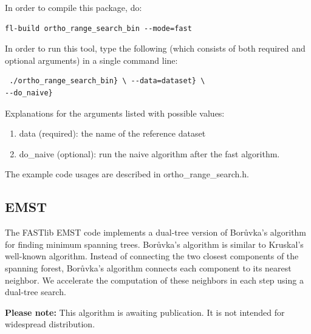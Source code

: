 \documentclass[letter]{report}
\begin{document}
In order to compile this package, do: 
\begin{verbatim}
fl-build ortho_range_search_bin --mode=fast
\end{verbatim}
In order to run this tool, type the following (which consists of
both required and optional arguments) in a single command line:
\begin{verbatim}
 ./ortho_range_search_bin} \ --data=dataset} \
--do_naive}
\end{verbatim}

Explanations for the arguments listed with possible values:

\begin{enumerate}
\item{data (required): the name of the reference dataset}
\item{do\_naive (optional): run the naive algorithm after the fast
algorithm.}
\end{enumerate}
The example code usages are described in ortho\_range\_search.h.

\subsection{EMST}
The FASTlib EMST code implements a dual-tree version of Bor\r{u}vka's algorithm for finding minimum spanning trees.  Bor\r{u}vka's algorithm is similar to Kruskal's well-known algorithm.  Instead of connecting the two closest components of the spanning forest, Bor\r{u}vka's algorithm connects each component to its nearest neighbor.  We accelerate the computation of these neighbors in each step using a dual-tree search.  

\textbf{Please note:}  This algorithm is awaiting publication.  It is not intended for widespread distribution.  
\end{document}
